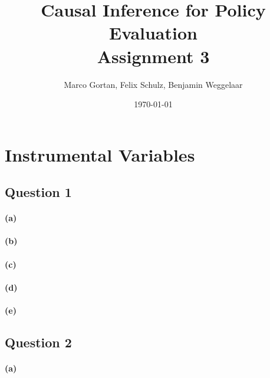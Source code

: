 \documentclass{scrartcl}
\title{Causal Inference for Policy Evaluation\\
\Large{Assignment 3}}
\author{Marco Gortan, Felix Schulz, Benjamin Weggelaar}
\date{\today}
\begin{document}
\maketitle

\section*{Instrumental Variables}

\subsection*{Question 1}

\paragraph*{(a)}



\paragraph*{(b)}


\paragraph*{(c)}


\paragraph*{(d)}

\paragraph*{(e)}

\subsection*{Question 2}

\paragraph*{(a)}
\end{document}
